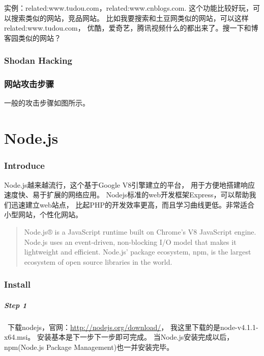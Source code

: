 \documentclass{book}
\begin{document}
实例：related:www.tudou.com，related:www.cnblogs.com.
这个功能比较好玩，可以搜索类似的网站，竞品网站。
比如我要搜索和土豆网类似的网站，可以这样 related:www.tudou.com，
优酷，爱奇艺，腾讯视频什么的都出来了。搜一下和博客园类似的网站？

\subsection{Shodan Hacking}

\subsection{网站攻击步骤}

一般的攻击步骤如图所示。




\chapter{Node.js}

\clearpage
\mbox{}         
\clearpage

\subsection{Introduce}

Node.js越来越流行，这个基于Google V8引擎建立的平台， 
用于方便地搭建响应速度快、易于扩展的网络应用。
Nodejs标准的web开发框架Express，可以帮助我们迅速建立web站点，
比起PHP的开发效率更高，而且学习曲线更低。非常适合小型网站，个性化网站。

\begin{quotation}
Node.js® is a JavaScript runtime built on Chrome's V8 JavaScript engine. 
Node.js uses an event-driven, non-blocking I/O model that makes it lightweight and efficient. 
Node.js' package ecosystem, npm, is the largest ecosystem of open source libraries in the world.
\end{quotation}

\subsection{Install}

\paragraph{Step 1}~下载nodejs，官网：\url{http://nodejs.org/download/}，
我这里下载的是node-v4.1.1-x64.msi。
安装基本是下一步下一步即可完成。
当Node.js安装完成以后，npm(Node.js Package Management)也一并安装完毕。
\end{document}
